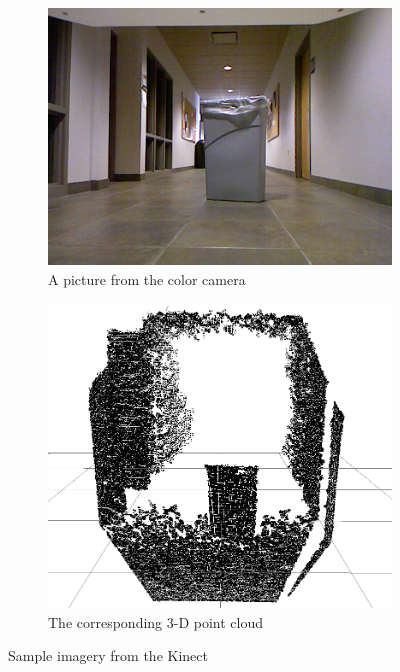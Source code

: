 \documentclass[12pt]{report}
\begin{document}
\begin{figure}
\begin{subfigure}{0.525\textwidth}
\includegraphics[width=\textwidth]{color.png}
\caption[Color picture]{A picture from the color camera}
\end{subfigure}
\begin{subfigure}{0.475\textwidth}
\includegraphics[width=\textwidth]{cloud.png}
\caption[Point cloud]{The corresponding 3-D point cloud}
\end{subfigure}
\caption[Kinect imagery]{Sample imagery from the Kinect}
\label{fig:samplefootage}
\end{figure}
\end{document}
